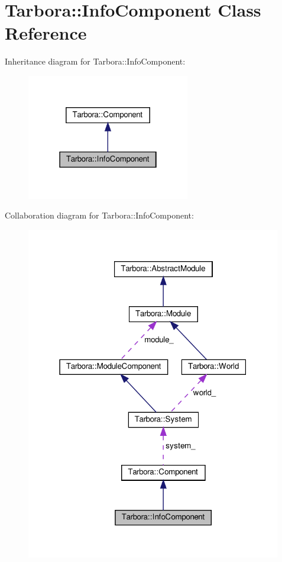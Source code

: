 \hypertarget{classTarbora_1_1InfoComponent}{}\section{Tarbora\+:\+:Info\+Component Class Reference}
\label{classTarbora_1_1InfoComponent}


Inheritance diagram for Tarbora\+:\+:Info\+Component\+:\nopagebreak
\begin{figure}[H]
\begin{center}
\leavevmode
\includegraphics[width=202pt]{classTarbora_1_1InfoComponent__inherit__graph}
\end{center}
\end{figure}


Collaboration diagram for Tarbora\+:\+:Info\+Component\+:\nopagebreak
\begin{figure}[H]
\begin{center}
\leavevmode
\includegraphics[width=316pt]{classTarbora_1_1InfoComponent__coll__graph}
\end{center}
\end{figure}

